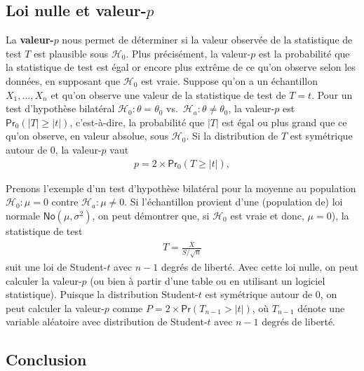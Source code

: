 \documentclass[
  11pt,
  letterpaper,
]{book}
\begin{document}
\hypertarget{loi-nulle-et-valeur-p}{%
\subsection{\texorpdfstring{Loi nulle et valeur-\(p\)}{Loi nulle et valeur-p}}\label{loi-nulle-et-valeur-p}}

La \textbf{valeur-\(p\)} nous permet de déterminer si la valeur observée de la statistique de test \(T\) est plausible sous \(\mathscr{H}_0\). Plus précisément, la valeur-\(p\) est la probabilité que la statistique de test est égal or encore plus extrême de ce qu'on observe selon les données, en supposant que \(\mathscr{H}_0\) est vraie. Suppose qu'on a un échantillon \(X_1, \ldots, X_n\) et qu'on observe une valeur de la statistique de test de \(T=t\). Pour un test d'hypothèse bilatéral \(\mathscr{H}_0:\theta=\theta_0\) vs.~\(\mathscr{H}_a:\theta \neq \theta_0\), la valeur-\(p\) est
\(\mathsf{Pr}_0(|T| \geq |t|)\), c'est-à-dire, la probabilité que \(|T|\) est égal ou plus grand que ce qu'on observe, en valeur absolue, sous \(\mathscr{H}_0\). Si la distribution de \(T\) est symétrique autour de \(0\), la valeur-\(p\) vaut
\begin{align*}
p = 2 \times \mathsf{Pr}_0(T \geq |t|), 
\end{align*}

Prenons l'exemple d'un test d'hypothèse bilatéral pour la moyenne au population \(\mathscr{H}_0:\mu=0\) contre \(\mathscr{H}_a:\mu \neq 0\). Si l'échantillon provient d'une (population de) loi normale \(\mathsf{No}(\mu, \sigma^2)\), on peut démontrer que, si \(\mathscr{H}_0\) est vraie et donc, \(\mu=0\)), la statistique de test
\begin{align*}
T = \frac{\overline{X}}{S/\sqrt{n}}
\end{align*}
suit une loi de Student-\(t\) avec \(n-1\) degrés de liberté. Avec cette loi nulle, on peut calculer la valeur-\(p\) (ou bien à partir d'une table ou en utilisant un logiciel statistique). Puisque la distribution Student-\(t\) est symétrique autour de \(0\), on peut calculer la valeur-\(p\) comme \(P = 2\times\mathsf{Pr}(T_{n-1} > |t|)\), où \(T_{n-1}\) dénote une variable aléatoire avec distribution de Student-\(t\) avec \(n-1\) degrés de liberté.

\hypertarget{conclusion}{%
\subsection{Conclusion}\label{conclusion}}
\end{document}
